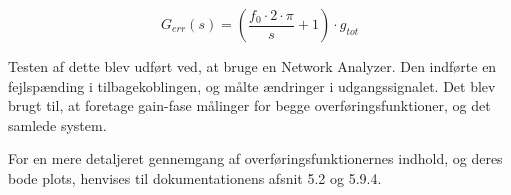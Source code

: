 \begin{equation} \label{H_err}
G_{err}(s) = \left(\frac{f_0 \cdot 2\cdot\pi}{s} + 1\right)  \cdot g_{tot}
\end{equation}

Testen af dette blev udført ved, at bruge en Network Analyzer. Den indførte en fejlspænding i tilbagekoblingen, og målte ændringer i udgangssignalet. Det blev brugt til, at foretage gain-fase målinger for begge overføringsfunktioner, og det samlede system. 

For en mere detaljeret gennemgang af overføringsfunktionernes indhold, og deres bode plots, henvises til dokumentationens afsnit 5.2 og 5.9.4.



